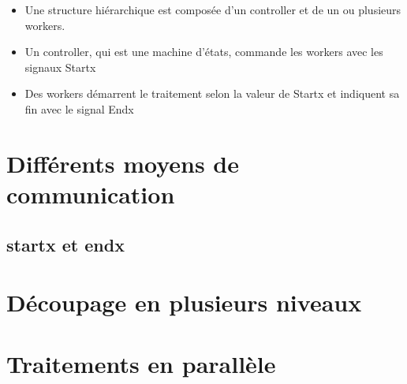 \begin{itemize}
    \item Une structure hiérarchique est composée d’un controller et de un ou plusieurs workers.
    \item Un controller, qui est une machine d’états, commande les workers avec les signaux Startx
    \item Des workers démarrent le traitement selon la valeur de Startx et indiquent sa fin avec le signal Endx
    
\end{itemize}

\section{Différents moyens de communication}
\subsection{startx et endx}

\section{Découpage en plusieurs niveaux}

\section{Traitements en parallèle}







